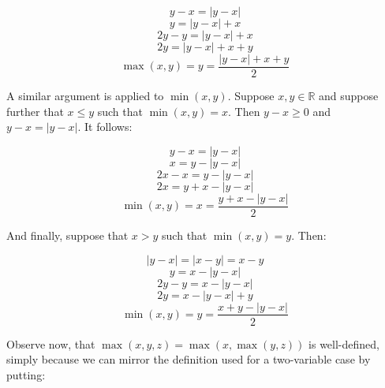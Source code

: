\documentclass{article}
\begin{document}
\begin{equation*}
	y - x = |y - x|
\end{equation*}
\begin{equation*}
	y = |y - x| + x
\end{equation*}
\begin{equation*}
	2y - y = |y - x| + x
\end{equation*}
\begin{equation*}
	2y = |y - x| + x + y
\end{equation*}
\begin{equation*}
	\max(x, y) = y = \frac{|y - x| + x + y}{2}
\end{equation*}


A similar argument is applied to \(\min(x, y)\). Suppose \(x, y \in \mathbb{R}\) 
and suppose further that \(x \leq y\) such that \(\min(x, y) = x\). Then \(y - x \geq 0\)
and \(y - x = |y - x|\). It follows:

\begin{equation*}
	y - x = |y - x|
\end{equation*}
\begin{equation*}
	x = y - |y - x|
\end{equation*}
\begin{equation*}
	2x - x = y - |y - x|
\end{equation*}
\begin{equation*}
	2x = y + x - |y - x|
\end{equation*}
\begin{equation*}
	\min(x, y) = x = \frac{y + x - |y - x|}{2}
\end{equation*}

And finally, suppose that \(x > y\) such that \(\min(x, y) = y\). Then:

\begin{equation*}
	|y - x| = |x - y| = x - y
\end{equation*}
\begin{equation*}
	y = x - |y - x|
\end{equation*}
\begin{equation*}
	2y - y = x - |y - x|
\end{equation*}
\begin{equation*}
	2y = x - |y - x| + y
\end{equation*}
\begin{equation*}
	\min(x, y) = y = \frac{x + y - |y - x|}{2}
\end{equation*}

Observe now, that \(\max(x, y, z) = \max(x, \max(y, z))\) is well-defined, simply because we can mirror
the definition used for a two-variable case by putting:
\end{document}
